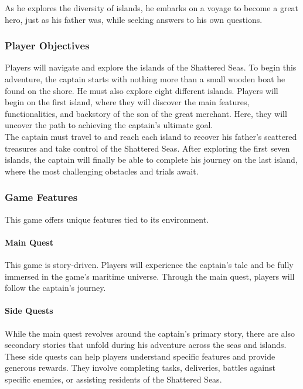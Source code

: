\documentclass{article}
\begin{document}
As he explores the diversity of islands, he embarks on a voyage to become a great hero, just as his father was, while seeking answers to his own questions.



\subsubsection{Player Objectives}\hfill

Players will navigate and explore the islands of the Shattered Seas. To begin this adventure, the captain starts with nothing more than a small wooden boat he found on the shore. He must also explore eight different islands. Players will begin on the first island, where they will discover the main features, functionalities, and backstory of the son of the great merchant. Here, they will uncover the path to achieving the captain's ultimate goal.\\

The captain must travel to and reach each island to recover his father's scattered treasures and take control of the Shattered Seas. After exploring the first seven islands, the captain will finally be able to complete his journey on the last island, where the most challenging obstacles and trials await.



\subsubsection{Game Features}\hfill

This game offers unique features tied to its environment.

\paragraph{Main Quest}\hfill

This game is story-driven. Players will experience the captain's tale and be fully immersed in the game's maritime universe. Through the main quest, players will follow the captain's journey.

\paragraph{Side Quests}\hfill

While the main quest revolves around the captain's primary story, there are also secondary stories that unfold during his adventure across the seas and islands. These side quests can help players understand specific features and provide generous rewards. They involve completing tasks, deliveries, battles against specific enemies, or assisting residents of the Shattered Seas.
\end{document}

